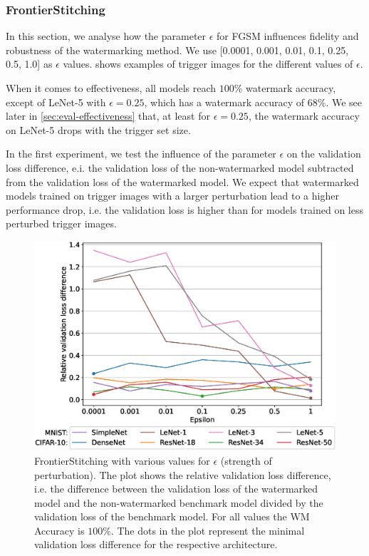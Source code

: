 \subsubsection{FrontierStitching} \label{sec:eval-param:frontier}

In this section, we analyse how the parameter $\epsilon$ for FGSM influences fidelity and robustness of the watermarking method. We use [0.0001, 0.001, 0.01, 0.1, 0.25, 0.5, 1.0] as $\epsilon$ values.  shows examples of trigger images for the different values of $\epsilon$.



When it comes to effectiveness, all models reach $100\%$ watermark accuracy, except of LeNet-5 with $\epsilon=0.25$, which has a watermark accuracy of $68\%$. We see later in \cref{sec:eval-effectiveness} that, at least for $\epsilon=0.25$, the watermark accuracy on LeNet-5 drops with the trigger set size.


In the first experiment, we test the influence of the parameter $\epsilon$ on the validation loss difference, e.i. the validation loss of the non-watermarked model subtracted from the validation loss of the watermarked model. We expect that watermarked models trained on trigger images with a larger perturbation lead to a higher performance drop, i.e. the validation loss is higher than for models trained on less perturbed trigger images.

\begin{figure}
    \centering
    \includegraphics[width = 0.8 \linewidth]{images/frontier/frontier_influence_epsilon_validloss_relative.eps}
    \caption{FrontierStitching with various values for $\epsilon$ (strength of perturbation). The plot shows the relative validation loss difference, i.e. the difference between the validation loss of the watermarked model and the non-watermarked benchmark model divided by the validation loss of the benchmark model. For all values the WM Accuracy is $100\%$. The dots in the plot represent the minimal validation loss difference for the respective architecture.}
    \label{fig:frontier_influence_epsilon}
\end{figure}

